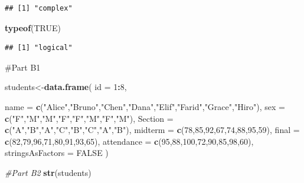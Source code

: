 \documentclass[
]{article}
\newenvironment{Shaded}{\begin{snugshade}}{\end{snugshade}}
\newcommand{\AttributeTok}[1]{\textcolor[rgb]{0.13,0.29,0.53}{#1}}
\newcommand{\CommentTok}[1]{\textcolor[rgb]{0.56,0.35,0.01}{\textit{#1}}}
\newcommand{\ConstantTok}[1]{\textcolor[rgb]{0.56,0.35,0.01}{#1}}
\newcommand{\DecValTok}[1]{\textcolor[rgb]{0.00,0.00,0.81}{#1}}
\newcommand{\FunctionTok}[1]{\textcolor[rgb]{0.13,0.29,0.53}{\textbf{#1}}}
\newcommand{\NormalTok}[1]{#1}
\newcommand{\OtherTok}[1]{\textcolor[rgb]{0.56,0.35,0.01}{#1}}
\newcommand{\SpecialCharTok}[1]{\textcolor[rgb]{0.81,0.36,0.00}{\textbf{#1}}}
\newcommand{\StringTok}[1]{\textcolor[rgb]{0.31,0.60,0.02}{#1}}
\begin{document}
\begin{verbatim}
## [1] "complex"
\end{verbatim}

\begin{Shaded}
\begin{Highlighting}[]
\FunctionTok{typeof}\NormalTok{(}\ConstantTok{TRUE}\NormalTok{)}
\end{Highlighting}
\end{Shaded}

\begin{verbatim}
## [1] "logical"
\end{verbatim}

\#Part B1

\begin{Shaded}
\begin{Highlighting}[]
\NormalTok{students}\OtherTok{\textless{}{-}}\FunctionTok{data.frame}\NormalTok{(}
  \AttributeTok{id =} \DecValTok{1}\SpecialCharTok{:}\DecValTok{8}\NormalTok{,}
  
  \AttributeTok{name =} \FunctionTok{c}\NormalTok{(}\StringTok{"Alice"}\NormalTok{,}\StringTok{"Bruno"}\NormalTok{,}\StringTok{"Chen"}\NormalTok{,}\StringTok{"Dana"}\NormalTok{,}\StringTok{"Elif"}\NormalTok{,}\StringTok{"Farid"}\NormalTok{,}\StringTok{"Grace"}\NormalTok{,}\StringTok{"Hiro"}\NormalTok{),}
  \AttributeTok{sex =} \FunctionTok{c}\NormalTok{(}\StringTok{"F"}\NormalTok{,}\StringTok{"M"}\NormalTok{,}\StringTok{"M"}\NormalTok{,}\StringTok{"F"}\NormalTok{,}\StringTok{"F"}\NormalTok{,}\StringTok{"M"}\NormalTok{,}\StringTok{"F"}\NormalTok{,}\StringTok{"M"}\NormalTok{),}
  \AttributeTok{Section =} \FunctionTok{c}\NormalTok{(}\StringTok{"A"}\NormalTok{,}\StringTok{"B"}\NormalTok{,}\StringTok{"A"}\NormalTok{,}\StringTok{"C"}\NormalTok{,}\StringTok{"B"}\NormalTok{,}\StringTok{"C"}\NormalTok{,}\StringTok{"A"}\NormalTok{,}\StringTok{"B"}\NormalTok{),}
  \AttributeTok{midterm =} \FunctionTok{c}\NormalTok{(}\DecValTok{78}\NormalTok{,}\DecValTok{85}\NormalTok{,}\DecValTok{92}\NormalTok{,}\DecValTok{67}\NormalTok{,}\DecValTok{74}\NormalTok{,}\DecValTok{88}\NormalTok{,}\DecValTok{95}\NormalTok{,}\DecValTok{59}\NormalTok{),}
  \AttributeTok{final =} \FunctionTok{c}\NormalTok{(}\DecValTok{82}\NormalTok{,}\DecValTok{79}\NormalTok{,}\DecValTok{96}\NormalTok{,}\DecValTok{71}\NormalTok{,}\DecValTok{80}\NormalTok{,}\DecValTok{91}\NormalTok{,}\DecValTok{93}\NormalTok{,}\DecValTok{65}\NormalTok{),}
  \AttributeTok{attendance =} \FunctionTok{c}\NormalTok{(}\DecValTok{95}\NormalTok{,}\DecValTok{88}\NormalTok{,}\DecValTok{100}\NormalTok{,}\DecValTok{72}\NormalTok{,}\DecValTok{90}\NormalTok{,}\DecValTok{85}\NormalTok{,}\DecValTok{98}\NormalTok{,}\DecValTok{60}\NormalTok{),}
  \AttributeTok{stringsAsFactors =} \ConstantTok{FALSE}
\NormalTok{)}


\CommentTok{\#Part B2}
\FunctionTok{str}\NormalTok{(students)}
\end{Highlighting}
\end{Shaded}
\end{document}

